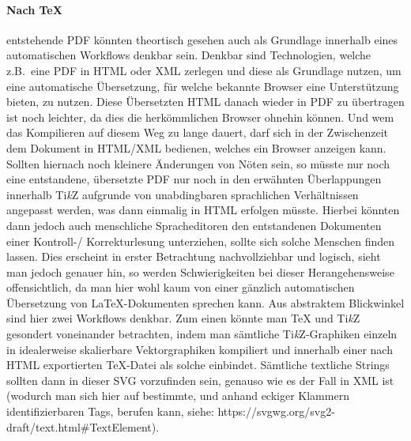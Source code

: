 \paragraph*{Nach TeX} entstehende PDF könnten theortisch gesehen auch als Grundlage innerhalb eines automatischen Workflows denkbar sein. Denkbar sind Technologien, welche z.B.\ eine PDF in HTML oder XML zerlegen und diese als Grundlage nutzen, um eine automatische Übersetzung, für welche bekannte Browser eine Unterstützung bieten, zu nutzen. Diese Übersetzten HTML danach wieder in PDF zu übertragen ist noch leichter, da dies die herkömmlichen Browser ohnehin können. Und wem das Kompilieren auf diesem Weg zu lange dauert, darf sich in der Zwischenzeit dem Dokument in HTML/XML bedienen, welches ein Browser anzeigen kann. Sollten hiernach noch kleinere Änderungen von Nöten sein, so müsste nur noch eine entstandene, übersetzte PDF nur noch in den erwähnten Überlappungen innerhalb Ti\textit{k}Z aufgrunde von unabdingbaren sprachlichen Verhältnissen angepasst werden, was dann einmalig in HTML erfolgen müsste. Hierbei könnten dann jedoch auch menschliche Spracheditoren den entstandenen Dokumenten einer Kontroll-/ Korrekturlesung unterziehen, sollte sich solche Menschen finden lassen. Dies erscheint in erster Betrachtung nachvollziehbar und logisch, sieht man jedoch genauer hin, so werden Schwierigkeiten bei dieser Herangehensweise offensichtlich, da man hier wohl kaum von einer gänzlich automatischen Übersetzung von \LaTeX{}-Dokumenten sprechen kann. Aus abstraktem Blickwinkel sind hier zwei Workflows denkbar. Zum einen könnte man \TeX{} und Ti\textit{k}Z gesondert voneinander betrachten, indem man sämtliche Ti\textit{k}Z-Graphiken einzeln in idealerweise skalierbare Vektorgraphiken kompiliert und innerhalb einer nach HTML exportierten \TeX{}-Datei als solche einbindet. Sämtliche textliche Strings sollten dann in dieser SVG vorzufinden sein, genauso wie es der Fall in XML ist (wodurch man sich hier auf bestimmte, und anhand eckiger Klammern identifizierbaren Tags, berufen kann, siehe: https://svgwg.org/svg2-draft/text.html#TextElement).%








